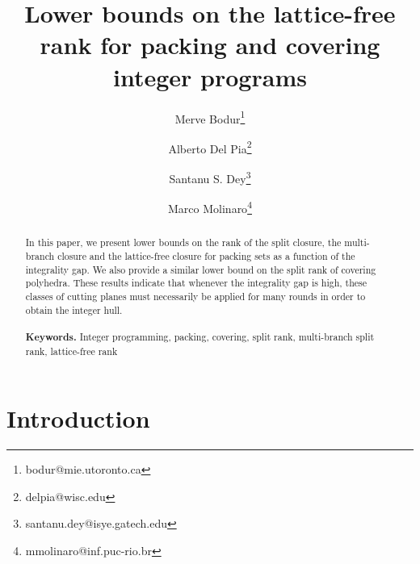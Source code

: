 \documentclass[11pt]{article}
\begin{document}
\title{Lower bounds on the lattice-free rank for packing and covering integer programs}

\author[1]{Merve Bodur\thanks{bodur@mie.utoronto.ca}}
\author[2]{Alberto Del Pia\thanks{delpia@wisc.edu}}
\author[3]{Santanu S. Dey\thanks{santanu.dey@isye.gatech.edu}}
\author[4]{Marco Molinaro\thanks{mmolinaro@inf.puc-rio.br}} 

\maketitle

\begin{abstract}
In this paper, we present lower bounds on the rank of the split closure, the multi-branch closure and the lattice-free closure for packing sets as a function of the integrality gap. We also provide a similar lower bound on the split rank of covering polyhedra. These results indicate that whenever the integrality gap is high, these classes of cutting planes must necessarily be applied for many rounds in order to obtain the integer hull.
\\ \\
\smallskip
\noindent \textbf{Keywords.} Integer programming, packing, covering, split rank, multi-branch split rank, lattice-free rank

\end{abstract}
\section{Introduction}
\label{sec:intro}
\end{document}
